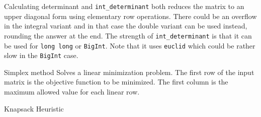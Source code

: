 \clearpage
{}
\categorycontents{}



\begin{algorithm}{Calculating determinant}
 and {\tt int\_determinant} both reduces the matrix
to an upper diagonal form using elementary row operations. There could be an
overflow in the integral variant and in that case the double variant
can be used instead, rounding the answer at the end. The strength of
{\tt int\_determinant} is that it can be used for {\tt long long} or
{\tt BigInt}. Note that it uses {\tt euclid} which could be rather
slow in the {\tt BigInt} case.
\end{algorithm}


\begin{algorithm}{Simplex method}
\desc
Solves a linear minimization problem. The first row of the
input matrix is the objective function to be minimized. The
first column is the maximum allowed value for each linear row.
\end{algorithm}

\begin{algorithm}{Knapsack Heuristic}
\end{algorithm}
